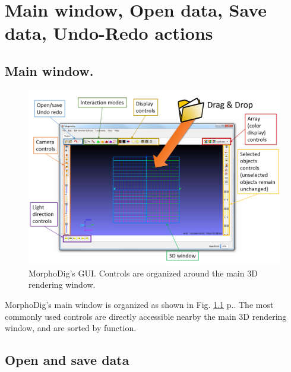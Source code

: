 \chapter{Main window, Open data, Save data, Undo-Redo actions}
\minitoc  

\section{Main window.}
\begin{figure}
  \centering
  \includegraphics[scale=0.3]{images/03/morphodig_gui.png} 
	\caption{MorphoDig's GUI. Controls are organized around the main 3D rendering window.}
\label{gui}
 
\end{figure}

MorphoDig's main window is organized as shown in Fig. \ref{gui} p.\pageref{gui}. The most commonly used controls are directly accessible nearby the main 3D rendering window, and are sorted by function. 

 \section{Open and save data}


